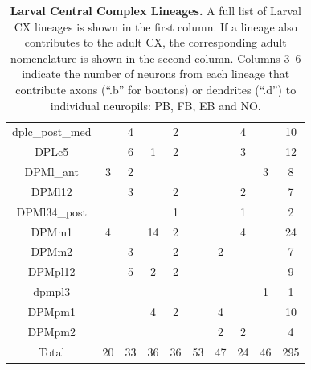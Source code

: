 \begin{table}
{\begin{tabular}{|c|c|c|c|c|c|c|c|c|c|}
    dplc\_post\_med &  & 4 &  & 2 &  &  & 4 &  & 10 \\
    DPLc5 &  & 6 & 1 & 2 &  &  & 3 &  & 12 \\
    DPMl\_ant & 3 & 2 &  &  &  &  &  & 3 & 8 \\
    DPMl12 &  & 3 &  & 2 &  &  & 2 &  & 7 \\
    DPMl34\_post &  &  &  & 1 &  &  & 1 &  & 2 \\
    DPMm1 & 4 &  & 14 & 2 &  &  & 4 &  & 24 \\
    DPMm2 &  & 3 &  & 2 &  & 2 &  &  & 7 \\
    DPMpl12 &  & 5 & 2 & 2 &  &  &  &  & 9 \\
    dpmpl3 &  &  &  &  &  &  &  & 1 & 1 \\
    DPMpm1 &  &  & 4 & 2 &  & 4 &  &  & 10 \\
    DPMpm2 &  &  &  &  &  & 2 & 2 &  & 4 \\
    \bottomrule
    Total & 20 & 33 & 36 & 36 & 53 & 47 & 24 & 46 & 295 \\
    \bottomrule
    \end{tabular}
    }
    \caption[Larval Central Complex Lineages]{\textbf{Larval Central Complex Lineages.} A full list of Larval CX lineages is shown in the first column. If a lineage also contributes to the adult CX, the corresponding adult nomenclature \citep{eckstein2024neurotransmitter} is shown in the second column. Columns 3--6 indicate the number of neurons from each lineage that contribute axons (“.b” for boutons) or dendrites (“.d”) to individual neuropils: PB, FB, EB and NO.}
    \label{larvallineages}
    \end{table}


